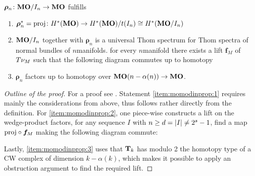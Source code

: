 \begin{Thm*}
  $\bm{\rho}_n\colon\bm{\mathrm{MO}}/I_{n}\to\bm{\mathrm{MO}}$ fulfills 
  \begin{enumerate}
  \item\label{item:momodinprop:1}
    ${\bm{\rho}}^*_n=\mathrm{proj}\colon
    H^*(\bm{\mathrm{MO}})
    \to H^*(\bm{\mathrm{MO}})/t(I_{n})\cong H^*(\bm{\mathrm{MO}}/I_{n})$
  \item\label{item:momodinprop:2}
    $\bm{\mathrm{MO}}/I_{n}$ together with $\bm{\rho}_n$ is a universal Thom spectrum
    for Thom spectra of normal bundles of $n$\nbd{}manifolds.
    \Idest for every $n$\nbd{}manifold there exists a lift $\bm{f}_M$ of
    $T{\nu_{M}}$ 
    such that the following diagram commutes up to homotopy
    \begin{center}
    \end{center}
  \item\label{item:momodinprop:3}
    $\bm{\rho}_n$ factors up to homotopy over
    $\bm{\mathrm{MO}}(n-\alpha(n))\to\bm{\mathrm{MO}}$.
  \end{enumerate}
  \begin{proof}[Outline of the proof]
    For a proof see \cite[Lemma~2.28, Theorem~2.29]{immersionconj}.
    Statement \ref{item:momodinprop:1} requires mainly the
    considerations from above, thus follows rather directly from the
    definition.
    For \ref{item:momodinprop:2}, one piece-wise constructs a lift on
    the wedge-product factors, \idest for any
    sequence $I$ with $n\geq d=\left|I\right|\neq2^s-1$, find a map
    $\mathrm{proj}\circ\bm{f}_M$ making the following diagram commute:
    \begin{center}
    \end{center}
    Lastly, \ref{item:momodinprop:3} uses that $\bm{\mathrm{T}}{}_{k}$ has
    modulo 2 the homotopy type of a CW complex of dimension $k-\alpha(k)$,
    which makes it possible to apply an obstruction argument to find
    the required lift.
  \end{proof}
\end{Thm*}


